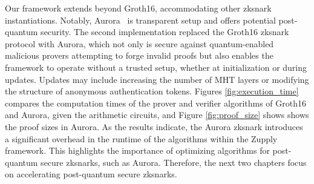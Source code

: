  Our framework extends beyond Groth16, accommodating other \gls{zksnark} instantiations. Notably, Aurora~\cite{Aurora2019} is transparent setup and offers potential post-quantum security.
The second implementation replaced the Groth16 \gls{zksnark} protocol with Aurora, which not only is secure against quantum-enabled malicious provers attempting to forge invalid proofs but also enables the framework to operate without a trusted setup, whether at initialization or during updates. Updates may include increasing the number of \textsf{MHT} layers or modifying the structure of anonymous authentication tokens. Figures \ref{fig:execution_time} compares the computation times of the prover and verifier algorithms of Groth16 and Aurora, given the arithmetic circuits, and Figure \ref{fig:proof_size} shows shows the proof sizes in Aurora.  As the results indicate, the Aurora \gls{zksnark} introduces a significant overhead in the runtime of the algorithms within the Zupply framework. This highlights the importance of optimizing algorithms for post-quantum secure \glspl{zksnark}, such as Aurora. Therefore, the next two chapters focus on accelerating post-quantum secure \glspl{zksnark}.









 
